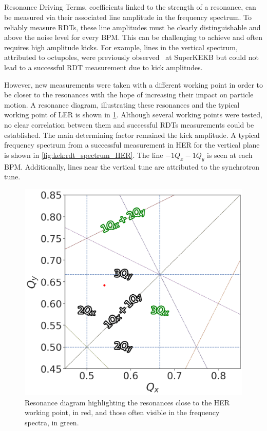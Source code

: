 \FloatBarrier
\subsection{}

Resonance Driving Terms, coefficients linked to the strength of a resonance, can be measured via
their associated line amplitude in the frequency spectrum. To reliably measure RDTs, these
line amplitudes must be clearly distinguishable and above the noise level for every BPM. This can be
challenging to achieve and often requires high amplitude kicks.
For example, lines in the vertical spectrum, attributed to octupoles, were previously
observed~\cite{keintzel_jacqueline_beam_2022} at SuperKEKB but could not lead to a successful RDT
measurement due to kick amplitudes.

However, new measurements were taken with a different working point in order to be closer to the 
resonances with the hope of increasing their impact on particle motion. A resonance diagram,
illustrating these resonances and the typical working point of LER is shown in
\cref{fig:kek:tune_diagram}. Although several working points were tested, no clear correlation
between them and successful RDTs measurements could be established. The main determining factor
remained the kick amplitude. A typical frequency spectrum from a successful measurement in HER for
the vertical plane is shown in \cref{fig:kek:rdt_spectrum_HER}. The line $-1Q_x - 1Q_y$ is seen at
each BPM. Additionally, lines near the vertical tune are attributed to the synchrotron tune.

\begin{figure}[!htb]
    \centering
    \includegraphics[width=0.6\linewidth]{images/kek/tune_diagram.png}
    \caption{Resonance diagram highlighting the resonances close to the HER working point, in red, 
    and those often visible in the frequency spectra, in green.}
    \label{fig:kek:tune_diagram}
\end{figure}

